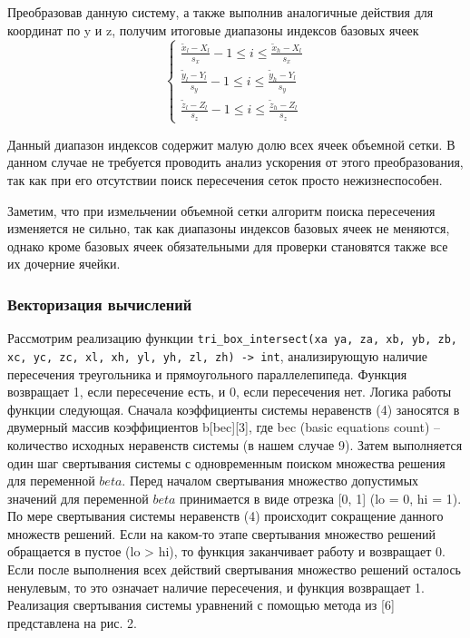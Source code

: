 Преобразовав данную систему, а также выполнив аналогичные действия для координат по y и z, получим итоговые диапазоны индексов базовых ячеек
\begin{equation}
	\left\{
		\begin{aligned}
			\frac{\tilde{x}_l - X_l}{s_x} - 1 \le i \le \frac{\tilde{x}_h - X_l}{s_x} \\
			\frac{\tilde{y}_l - Y_l}{s_y} - 1 \le i \le \frac{\tilde{y}_h - Y_l}{s_y} \\
			\frac{\tilde{z}_l - Z_l}{s_z} - 1 \le i \le \frac{\tilde{z}_h - Z_l}{s_z}
		\end{aligned}
	\right.
\end{equation}

Данный диапазон индексов содержит малую долю всех ячеек объемной сетки.
В данном случае не требуется проводить анализ ускорения от этого преобразования, так как при его отсутствии поиск пересечения сеток просто нежизнеспособен.

Заметим, что при измельчении объемной сетки алгоритм поиска пересечения изменяется не сильно, так как диапазоны индексов базовых ячеек не меняются, однако кроме базовых ячеек обязательными для проверки становятся также все их дочерние ячейки.

\subsubsection{Векторизация вычислений}

Рассмотрим реализацию функции \texttt{tri\_box\_intersect(xa ya, za, xb, yb, zb, xc, yc, zc, xl, xh, yl, yh, zl, zh) -> int}, анализирующую наличие пересечения треугольника и прямоугольного параллелепипеда.
Функция возвращает 1, если пересечение есть, и 0, если пересечения нет.
Логика работы функции следующая.
Сначала коэффициенты системы неравенств (4) заносятся в двумерный массив коэффициентов b[bec][3], где bec (basic equations count) -- количество исходных неравенств системы (в нашем случае 9).
Затем выполняется один шаг свертывания системы с одновременным поиском множества решения для переменной $beta$.
Перед началом свертывания множество допустимых значений для переменной $beta$ принимается в виде отрезка [0, 1] (lo = 0, hi = 1).
По мере свертывания системы неравенств (4) происходит сокращение данного множеств решений.
Если на каком-то  этапе свертывания множество решений обращается в пустое (lo > hi), то функция заканчивает работу и возвращает 0.
Если после выполнения всех действий свертывания множество решений осталось ненулевым, то это означает наличие пересечения, и функция возвращает 1.
Реализация свертывания системы уравнений с помощью метода из [6] представлена на рис. 2.

